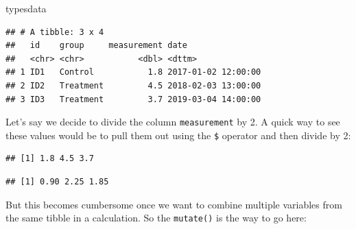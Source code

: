 \documentclass[
  12pt,
  krantz2]{krantz}
\makeatletter
\newenvironment{Shaded}{\begin{snugshade}}{\end{snugshade}}
\newcommand{\DecValTok}[1]{\textcolor[rgb]{0.00,0.00,0.81}{#1}}
\newcommand{\KeywordTok}[1]{\textcolor[rgb]{0.13,0.29,0.53}{\textbf{#1}}}
\newcommand{\NormalTok}[1]{#1}
\newcommand{\OperatorTok}[1]{\textcolor[rgb]{0.81,0.36,0.00}{\textbf{#1}}}
\newcommand{\StringTok}[1]{\textcolor[rgb]{0.31,0.60,0.02}{#1}}
\newenvironment{kframe}{%
\medskip{}
\setlength{\fboxsep}{.8em}
 \def\at@end@of@kframe{}%
 \ifinner\ifhmode%
  \def\at@end@of@kframe{\end{minipage}}%
  \begin{minipage}{\columnwidth}%
 \fi\fi%
 \def\FrameCommand##1{\hskip\@totalleftmargin \hskip-\fboxsep
 \colorbox{shadecolor}{##1}\hskip-\fboxsep
     \hskip-\linewidth \hskip-\@totalleftmargin \hskip\columnwidth}%
 \MakeFramed {\advance\hsize-\width
   \@totalleftmargin\z@ \linewidth\hsize
   \@setminipage}}%
 {\par\unskip\endMakeFramed%
 \at@end@of@kframe}
\renewenvironment{Shaded}{\begin{kframe}}{\end{kframe}}
\makeatother
\begin{document}
\begin{Shaded}
\begin{Highlighting}[]
\NormalTok{typesdata}
\end{Highlighting}
\end{Shaded}

\begin{verbatim}
## # A tibble: 3 x 4
##   id    group     measurement date               
##   <chr> <chr>           <dbl> <dttm>             
## 1 ID1   Control           1.8 2017-01-02 12:00:00
## 2 ID2   Treatment         4.5 2018-02-03 13:00:00
## 3 ID3   Treatment         3.7 2019-03-04 14:00:00
\end{verbatim}

Let's say we decide to divide the column \texttt{measurement} by 2.
A quick way to see these values would be to pull them out using the \texttt{\$} operator and then divide by 2:

\begin{Shaded}
\end{Shaded}

\begin{verbatim}
## [1] 1.8 4.5 3.7
\end{verbatim}

\begin{Shaded}
\end{Shaded}

\begin{verbatim}
## [1] 0.90 2.25 1.85
\end{verbatim}

But this becomes cumbersome once we want to combine multiple variables from the same tibble in a calculation. So the \texttt{mutate()} is the way to go here:

\begin{Shaded}
\end{Shaded}
\end{document}
